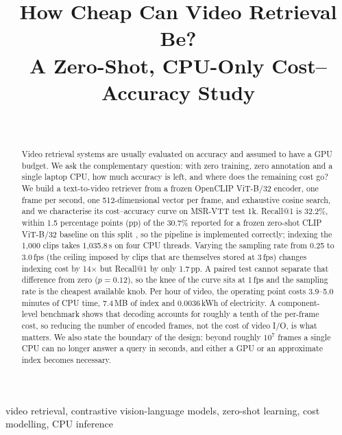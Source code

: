 \documentclass[journal]{IEEEtran}
\begin{document}
\title{How Cheap Can Video Retrieval Be?\\A Zero-Shot, CPU-Only Cost--Accuracy Study}

\author{\\[2pt]
}

\maketitle

\begin{abstract}
Video retrieval systems are usually evaluated on accuracy and assumed to have a GPU
budget. We ask the complementary question: with zero training, zero annotation and a
single laptop CPU, how much accuracy is left, and where does the remaining cost go? We
build a text-to-video retriever from a frozen OpenCLIP ViT-B/32 encoder, one frame per
second, one 512-dimensional vector per frame, and exhaustive cosine search, and we
characterise its cost--accuracy curve on MSR-VTT test 1k. Recall@1 is 32.2\%, within 1.5 percentage
points (pp) of the 30.7\% reported for a frozen zero-shot CLIP ViT-B/32 baseline on this split
\cite{ventura2024learning}, so
the pipeline is implemented correctly;
indexing the 1,000 clips takes 1{,}035.8\,s on four CPU threads. Varying the sampling rate
from 0.25 to 3.0\,fps (the ceiling imposed by clips that are themselves stored at 3\,fps) changes indexing cost by 14$\times$ but Recall@1 by only 1.7\,pp. A paired test
cannot separate that difference from zero ($p=0.12$), so the knee of the curve sits at 1\,fps and
the sampling rate is the cheapest available knob. Per hour of video, the operating point costs
3.9--5.0 minutes of CPU time, 7.4\,MB of index and 0.0036\,kWh of electricity. A
component-level benchmark shows that decoding accounts for roughly a tenth of the
per-frame cost, so reducing the number of encoded frames, not the cost of video I/O, is
what matters. We also state the boundary of the design: beyond roughly $10^{7}$ frames a single
CPU can no longer answer a query in seconds, and either a GPU or an approximate index becomes
necessary.
\end{abstract}

\begin{IEEEkeywords}
video retrieval, contrastive vision-language models, zero-shot learning, cost modelling,
CPU inference
\end{IEEEkeywords}
\end{document}
